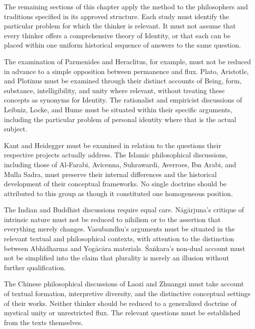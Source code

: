 \label{para:VS.B01.P01.C08.S01.SS09.P001}
The remaining sections of this chapter apply the
method to the philosophers and traditions specified
in its approved structure. Each study must identify
the particular problem for which the thinker is
relevant. It must not assume that every thinker
offers a comprehensive theory of Identity, or that
each can be placed within one uniform historical
sequence of answers to the same question.

\label{para:VS.B01.P01.C08.S01.SS09.P002}
The examination of Parmenides and Heraclitus, for
example, must not be reduced in advance to a simple
opposition between permanence and flux. Plato,
Aristotle, and Plotinus must be examined through
their distinct accounts of Being, form, substance,
intelligibility, and unity where relevant, without
treating these concepts as synonyms for Identity.
The rationalist and empiricist discussions of
Leibniz, Locke, and Hume must be situated within
their specific arguments, including the particular
problem of personal identity where that is the
actual subject.

\label{para:VS.B01.P01.C08.S01.SS09.P003}
Kant and Heidegger must be examined in relation to
the questions their respective projects actually
address. The Islamic philosophical discussions,
including those of Al-Farabi, Avicenna, Suhrawardi,
Averroes, Ibn Arabi, and Mulla Sadra, must preserve
their internal differences and the historical
development of their conceptual frameworks. No
single doctrine should be attributed to this group
as though it constituted one homogeneous position.

\label{para:VS.B01.P01.C08.S01.SS09.P004}
The Indian and Buddhist discussions require equal
care. Nāgārjuna's critique of intrinsic nature must
not be reduced to nihilism or to the assertion that
everything merely changes. Vasubandhu's arguments
must be situated in the relevant textual and
philosophical contexts, with attention to the
distinction between Abhidharma and Yogācāra
materials. Śaṅkara's non-dual account must not be
simplified into the claim that plurality is merely
an illusion without further qualification.

\label{para:VS.B01.P01.C08.S01.SS09.P005}
The Chinese philosophical discussions of Laozi and
Zhuangzi must take account of textual formation,
interpretive diversity, and the distinctive
conceptual settings of their works. Neither thinker
should be reduced to a generalized doctrine of
mystical unity or unrestricted flux. The relevant
questions must be established from the texts
themselves.

